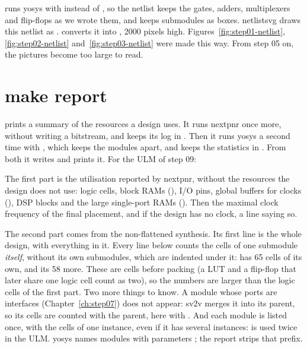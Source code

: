 \textbf{} runs yosys with  instead of
, so the netlist keeps the gates, adders, multiplexers and
flip-flops as we wrote them, and keeps submodules as boxes. netlistsvg draws
this netlist as . \textbf{} converts it into
, 2000 pixels high. Figures~\ref{fig:step01-netlist},
\ref{fig:step02-netlist} and~\ref{fig:step03-netlist} were made this way. From
step 05 on, the pictures become too large to read.

\section{make report}
\label{sec:tools-report}

 prints a summary of the resources a design uses. It runs
nextpnr once more, without writing a bitstream, and keeps its log in
. Then it runs yosys a second time with
, which keeps the modules apart, and keeps the
statistics in . From both it writes
 and prints it. For the ULM of step 09:


The first part is the utilisation reported by nextpnr, without the resources
the design does not use: logic cells, block RAMs (), I/O pins,
global buffers for clocks (), DSP blocks and the large single-port
RAMs (). Then the maximal clock frequency of the final
placement, and if the design has no clock, a line saying so.

The second part comes from the non-flattened synthesis. Its first line is the
whole design,  with everything in it. Every line below counts the cells
of one submodule \emph{itself}, without its own submodules, which are indented
under it:  has 65 cells of its own, and its  58
more. These are cells before packing (a LUT and a flip-flop that later share
one logic cell count as two), so the numbers are larger than the logic cells of
the first part. Two more things to know. A module whose ports are interfaces
(Chapter~\ref{ch:step07}) does not appear: sv2v merges it into its parent, so
its cells are counted with the parent, here with . And each module is
listed once, with the cells of one instance, even if it has several instances:
 is used twice in the ULM. yosys names modules with parameters
; the report strips that prefix.

